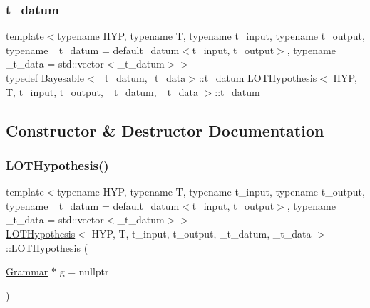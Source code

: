 \mbox{\label{class_l_o_t_hypothesis_a26d0ecfa6a367f32276d36cd01c0cead}} 
\subsubsection{\texorpdfstring{t\+\_\+datum}{t\_datum}}
{\footnotesize\ttfamily template$<$typename H\+YP, typename T, typename t\+\_\+input, typename t\+\_\+output, typename \+\_\+t\+\_\+datum = default\+\_\+datum$<$t\+\_\+input, t\+\_\+output$>$, typename \+\_\+t\+\_\+data = std\+::vector$<$\+\_\+t\+\_\+datum$>$$>$ \\
typedef \hyperlink{class_bayesable}{Bayesable}$<$\+\_\+t\+\_\+datum,\+\_\+t\+\_\+data$>$\+::\hyperlink{class_l_o_t_hypothesis_a26d0ecfa6a367f32276d36cd01c0cead}{t\+\_\+datum} \hyperlink{class_l_o_t_hypothesis}{L\+O\+T\+Hypothesis}$<$ H\+YP, T, t\+\_\+input, t\+\_\+output, \+\_\+t\+\_\+datum, \+\_\+t\+\_\+data $>$\+::\hyperlink{class_l_o_t_hypothesis_a26d0ecfa6a367f32276d36cd01c0cead}{t\+\_\+datum}}



\subsection{Constructor \& Destructor Documentation}
\mbox{\label{class_l_o_t_hypothesis_a47dcb988a9cb4bba00263851d697fc12}} 
\subsubsection{\texorpdfstring{L\+O\+T\+Hypothesis()}{LOTHypothesis()}\hspace{0.1cm}{\footnotesize\ttfamily [1/4]}}
{\footnotesize\ttfamily template$<$typename H\+YP, typename T, typename t\+\_\+input, typename t\+\_\+output, typename \+\_\+t\+\_\+datum = default\+\_\+datum$<$t\+\_\+input, t\+\_\+output$>$, typename \+\_\+t\+\_\+data = std\+::vector$<$\+\_\+t\+\_\+datum$>$$>$ \\
\hyperlink{class_l_o_t_hypothesis}{L\+O\+T\+Hypothesis}$<$ H\+YP, T, t\+\_\+input, t\+\_\+output, \+\_\+t\+\_\+datum, \+\_\+t\+\_\+data $>$\+::\hyperlink{class_l_o_t_hypothesis}{L\+O\+T\+Hypothesis} (\begin{DoxyParamCaption}\item[{\hyperlink{class_grammar}{Grammar} $\ast$}]{g = {\ttfamily nullptr} }\end{DoxyParamCaption})\hspace{0.3cm}{\ttfamily [inline]}}

